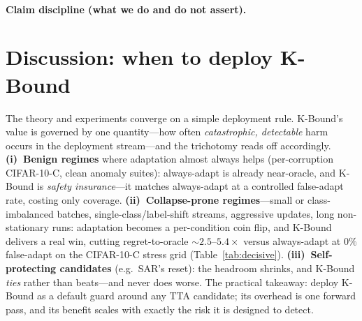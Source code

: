 \documentclass[conference]{IEEEtran}
\theoremstyle{plain}
\theoremstyle{definition}
\begin{document}
\paragraph{Claim discipline (what we do and do not assert).}
\begin{center}\small
{}
\end{center}

\section{Discussion: when to deploy K-Bound}\label{sec:discussion}
The theory and experiments converge on a simple deployment rule. K-Bound's value is governed
by one quantity---how often \emph{catastrophic, detectable} harm occurs in the deployment
stream---and the trichotomy reads off accordingly. \textbf{(i)~Benign regimes} where adaptation
almost always helps (per-corruption CIFAR-10-C, clean anomaly suites): always-adapt is already
near-oracle, and K-Bound is \emph{safety insurance}---it matches always-adapt at a controlled
false-adapt rate, costing only coverage. \textbf{(ii)~Collapse-prone regimes}---small or
class-imbalanced batches, single-class/label-shift streams, aggressive updates, long
non-stationary runs: adaptation becomes a per-condition coin flip, and K-Bound delivers a real
win, cutting regret-to-oracle $\sim$$2.5$--$5.4\times$ versus always-adapt at $0\%$ false-adapt
on the CIFAR-10-C stress grid (Table~\ref{tab:decisive}). \textbf{(iii)~Self-protecting
candidates} (e.g.\ SAR's reset): the headroom shrinks, and K-Bound \emph{ties} rather than
beats---and never does worse. The practical takeaway: deploy K-Bound as a default guard around
any TTA candidate; its overhead is one forward pass, and its benefit scales with exactly the
risk it is designed to detect.
\end{document}
